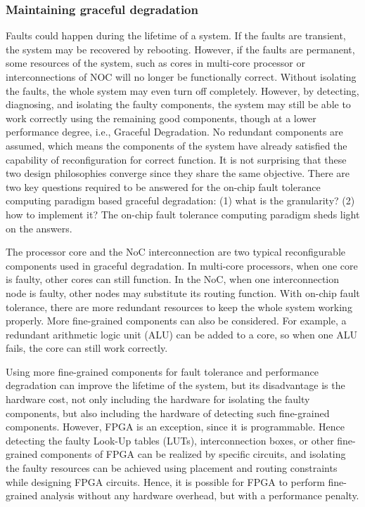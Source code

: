 \subsubsection{Maintaining graceful degradation}
Faults could happen during the lifetime of a system. If the faults are transient, the system may be recovered by rebooting. However, if the faults are permanent, some resources of the system, such as cores in multi-core processor or interconnections of NOC will no longer be functionally correct. Without isolating the faults, the whole system may even turn off completely. However, by detecting, diagnosing, and isolating the faulty components, the system may still be able to work correctly using the remaining good components, though at a lower performance degree, i.e., Graceful Degradation. No redundant components are assumed, which means the components of the system have already satisfied the capability of reconfiguration for correct function. It is not surprising that these two design philosophies converge since they share the same objective. There are two key questions required to be answered for the on-chip fault tolerance computing paradigm based graceful degradation: (1) what is the granularity? (2) how to implement it? The on-chip fault tolerance computing paradigm sheds light on the answers.

The processor core and the NoC interconnection are two typical reconfigurable components used in graceful degradation. In multi-core processors, when one core is faulty, other cores can still function. In the NoC, when one interconnection node is faulty, other nodes may substitute its routing function. With on-chip fault tolerance, there are more redundant resources to keep the whole system working properly. More fine-grained components can also be considered. For example, a redundant arithmetic logic unit (ALU) can be added to a core, so when one ALU fails, the core can still work correctly.

Using more fine-grained components for fault tolerance and performance degradation can improve the lifetime of the system, but its disadvantage is the hardware cost, not only including the hardware for isolating the faulty components, but also including the hardware of detecting such fine-grained components. However, FPGA is an exception, since it is programmable. Hence detecting the faulty Look-Up tables (LUTs), interconnection boxes, or other fine-grained components of FPGA can be realized by specific circuits, and isolating the faulty resources can be achieved using placement and routing constraints while designing FPGA circuits. Hence, it is possible for FPGA to perform fine-grained analysis without any hardware overhead, but with a performance penalty.

